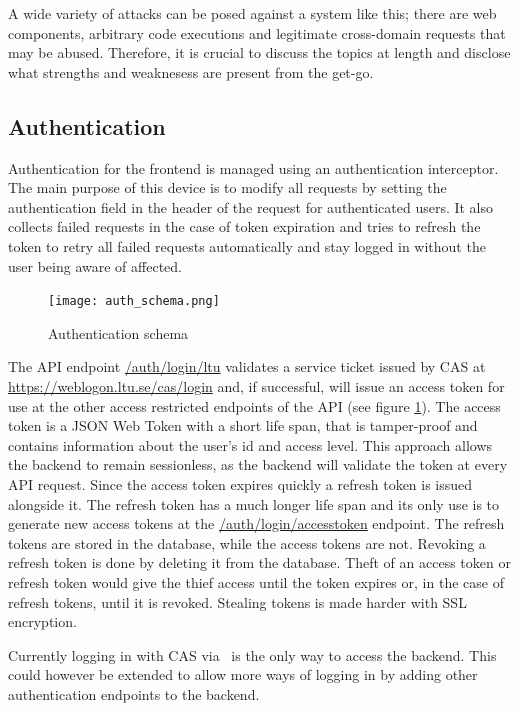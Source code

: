A wide variety of attacks can be posed against a system like this; there are web components, arbitrary code executions and legitimate cross-domain requests that may be abused. Therefore, it is crucial to discuss the topics at length and disclose what strengths and weaknesess are present from the get-go.

\subsection{Authentication}
Authentication for the frontend is managed using an authentication interceptor. The main purpose of this device is to modify all requests by setting the authentication field in the header of the request for authenticated users. It also collects failed requests in the case of token expiration and tries to refresh the token to retry all failed requests automatically and stay logged in without the user being aware of affected.
\begin{figure}[hb]
    \centering
    \texttt{[image: auth\_schema.png]}
    \caption{Authentication schema}
    \label{fig:auth}
\end{figure}

The API endpoint \url{/auth/login/ltu} validates a service ticket issued by CAS at \url{https://weblogon.ltu.se/cas/login} and, if successful, will issue an access token for use at the other access restricted endpoints of the API (see figure \ref{fig:auth}). The access token is a JSON Web Token with a short life span, that is tamper-proof and contains information about the user's id and access level. This approach allows the backend to remain sessionless, as the backend will validate the token at every API request. Since the access token expires quickly a refresh token is issued alongside it. The refresh token has a much longer life span and its only use is to generate new access tokens at the \url{/auth/login/accesstoken} endpoint. The refresh tokens are stored in the database, while the access tokens are not. Revoking a refresh token is done by deleting it from the database. Theft of an access token or refresh token would give the thief access until the token expires or, in the case of refresh tokens, until it is revoked. Stealing tokens is made harder with SSL encryption.

Currently logging in with CAS via \LTU\ is the only way to access the backend. This could however be extended to allow more ways of logging in by adding other authentication endpoints to the backend.

